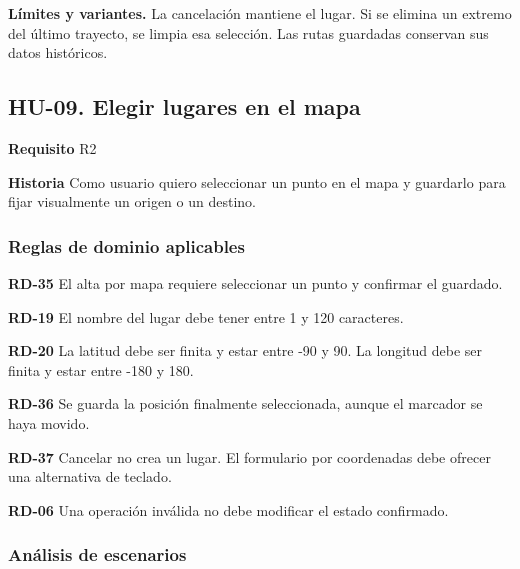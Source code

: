 {\fontsize{9}{11.8}\selectfont\textbf{Límites y variantes.} La cancelación mantiene el lugar. Si se elimina un extremo del último trayecto, se limpia esa selección. Las rutas guardadas conservan sus datos históricos.\par}\vspace{4pt}
\clearpage\subsection*{HU-09. Elegir lugares en el mapa}

\textbf{Requisito} R2\par

\textbf{Historia} Como usuario quiero seleccionar un punto en el mapa y guardarlo para fijar visualmente un origen o un destino.\par

\subsubsection*{Reglas de dominio aplicables}

\textbf{RD-35} El alta por mapa requiere seleccionar un punto y confirmar el guardado.\par

\textbf{RD-19} El nombre del lugar debe tener entre 1 y 120 caracteres.\par

\textbf{RD-20} La latitud debe ser finita y estar entre -90 y 90. La longitud debe ser finita y estar entre -180 y 180.\par

\textbf{RD-36} Se guarda la posición finalmente seleccionada, aunque el marcador se haya movido.\par

\textbf{RD-37} Cancelar no crea un lugar. El formulario por coordenadas debe ofrecer una alternativa de teclado.\par

\textbf{RD-06} Una operación inválida no debe modificar el estado confirmado.\par

\subsubsection*{Análisis de escenarios}

